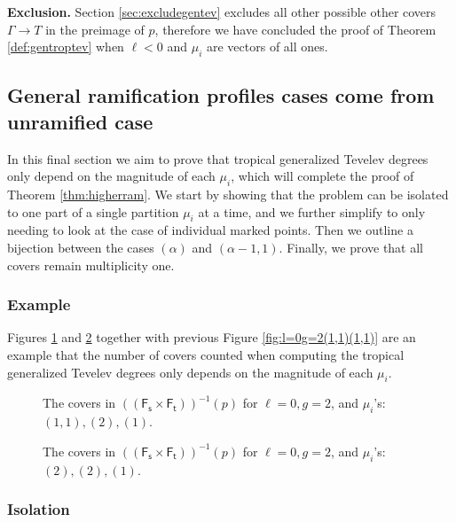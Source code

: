 \documentclass[11pt,reqno]{amsart}
\newcommand{\inputTikZ}[2]{%
     \resizebox{#1}{!}{}}
\theoremstyle{definition}
\newcommand{\Ft}{\mathsf{F_t}}
\newcommand{\Fs}{\mathsf{F_s}}
\begin{document}
    \noindent\textbf{Exclusion.}
Section \ref{sec:excludegentev} excludes all other possible other covers $\Gamma\to T$ in the preimage of $p$, therefore we have concluded the proof of Theorem \ref{def:gentroptev} when $\ell<0$ and $\mu_i$ are vectors of all ones.
    
 \subsection{General ramification profiles cases come from unramified case}

 In this final section we aim to prove that tropical generalized Tevelev degrees only depend on the magnitude of each $\mu_i$, which will complete the proof of Theorem \ref{thm:higherram}. We start by showing that the problem can be isolated to one part of a single partition $\mu_i$ at a time, and we further simplify to only needing to look at the case of individual marked points. Then we outline a bijection between the cases $(\alpha)$ and $(\alpha-1,1)$. Finally, we prove that all covers remain multiplicity one. 

\subsubsection*{Example}
Figures \ref{fig:ell=0,g=1,(2)(1,1)} and \ref{fig:ell=0,g=1,(2)(2)} together with previous Figure \ref{fig:l=0g=2(1,1)(1,1)} are an example that the number of covers counted when computing the tropical generalized Tevelev degrees only depends on the magnitude of each $\mu_i$. 
     \begin{figure}[tb]
         \centering
         \inputTikZ{.6\textwidth}{Figures/l=0,g=2,_1,1__2_}
         \caption{The covers in $((\Fs \times \Ft))^{-1}(p)$ for $\ell=0,g=2$, and $\mu_i$'s:$(1,1),(2),(1)$.}
         \label{fig:ell=0,g=1,(2)(1,1)}
     \end{figure}

\begin{figure}[tb]
         \centering
         \inputTikZ{.6\textwidth}{Figures/l=0,g=2,_2__2_}
         \caption{The covers in $((\Fs \times \Ft))^{-1}(p)$ for $\ell=0,g=2$, and $\mu_i$'s:$(2),(2),(1)$.}
         \label{fig:ell=0,g=1,(2)(2)}
     \end{figure}
     

\subsubsection*{Isolation}
\end{document}
